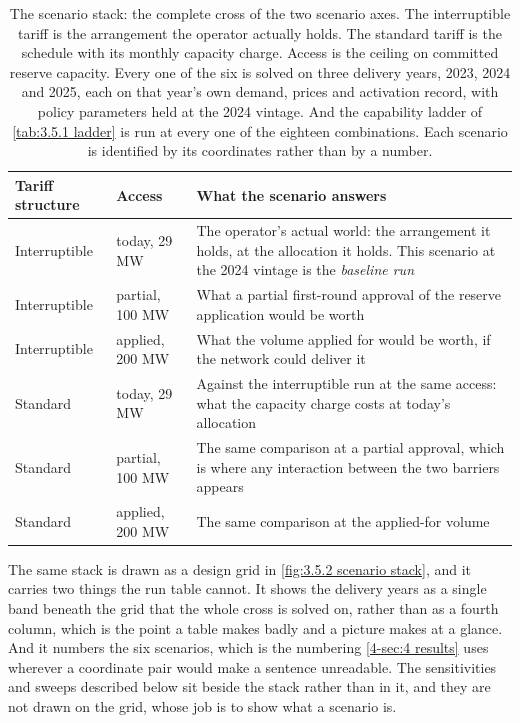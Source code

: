 \begin{table}[h]
\centering
\caption{The scenario stack: the complete cross of the two scenario axes. The interruptible tariff is the arrangement the operator actually holds. The standard tariff is the schedule with its monthly capacity charge. Access is the ceiling on committed reserve capacity. Every one of the six is solved on three delivery years, 2023, 2024 and 2025, each on that year's own demand, prices and activation record, with policy parameters held at the 2024 vintage. And the capability ladder of \autoref{tab:3.5.1 ladder} is run at every one of the eighteen combinations. Each scenario is identified by its coordinates rather than by a number.}
\small
\begin{tabular}{p{2.5cm} p{2.1cm} p{9.4cm}}
\toprule
\textbf{Tariff structure} & \textbf{Access} & \textbf{What the scenario answers} \\
\midrule
Interruptible & today, 29 MW & The operator's actual world: the arrangement it holds, at the allocation it holds. This scenario at the 2024 vintage is the \emph{baseline run} \\
Interruptible & partial, 100 MW & What a partial first-round approval of the reserve application would be worth \\
Interruptible & applied, 200 MW & What the volume applied for would be worth, if the network could deliver it \\
\addlinespace
Standard & today, 29 MW & Against the interruptible run at the same access: what the capacity charge costs at today's allocation \\
Standard & partial, 100 MW & The same comparison at a partial approval, which is where any interaction between the two barriers appears \\
Standard & applied, 200 MW & The same comparison at the applied-for volume \\
\bottomrule
\end{tabular}
\label{tab:3.5.2 scenario stack}
\end{table}

The same stack is drawn as a design grid in \autoref{fig:3.5.2 scenario stack}, and it carries two things the run table cannot. It shows the delivery years as a single band beneath the grid that the whole cross is solved on, rather than as a fourth column, which is the point a table makes badly and a picture makes at a glance. And it numbers the six scenarios, which is the numbering \autoref{4-sec:4 results} uses wherever a coordinate pair would make a sentence unreadable. The sensitivities and sweeps described below sit beside the stack rather than in it, and they are not drawn on the grid, whose job is to show what a scenario is.

